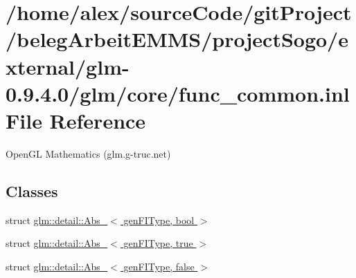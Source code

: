 \hypertarget{func__common_8inl}{\section{/home/alex/source\-Code/git\-Project/beleg\-Arbeit\-E\-M\-M\-S/project\-Sogo/external/glm-\/0.9.4.0/glm/core/func\-\_\-common.inl File Reference}
\label{func__common_8inl}
}


Open\-G\-L Mathematics (glm.\-g-\/truc.\-net)  


\subsection*{Classes}
\begin{DoxyCompactItemize}
\item 
struct \hyperlink{structglm_1_1detail_1_1Abs__}{glm\-::detail\-::\-Abs\-\_\-$<$ gen\-F\-I\-Type, bool $>$}
\item 
struct \hyperlink{structglm_1_1detail_1_1Abs___3_01genFIType_00_01true_01_4}{glm\-::detail\-::\-Abs\-\_\-$<$ gen\-F\-I\-Type, true $>$}
\item 
struct \hyperlink{structglm_1_1detail_1_1Abs___3_01genFIType_00_01false_01_4}{glm\-::detail\-::\-Abs\-\_\-$<$ gen\-F\-I\-Type, false $>$}
\end{DoxyCompactItemize}
